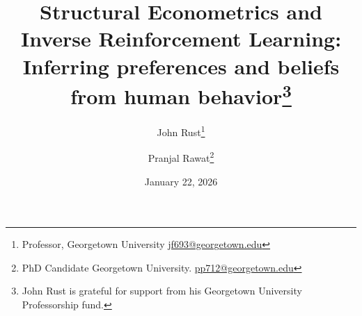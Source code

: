 \documentclass[11pt]{article}
\title{ \vspace*{1cm} \hspace*{-0.5cm}Structural Econometrics and Inverse Reinforcement Learning:\\
Inferring preferences and beliefs from human behavior\footnote{John Rust is grateful for support
from his Georgetown University Professorship fund.
}}
\author{John Rust\thanks{Professor, Georgetown University
\href{mailto:jf693@georgetown.edu}{jf693@georgetown.edu}} \and Pranjal Rawat\thanks{PhD Candidate Georgetown University.  \href{mailto:pp712@georgetown.edu}{pp712@georgetown.edu}}}
\date{ \vspace*{0.5cm} January 22, 2026 \\ \bigskip {\Large PRELIMINARY DRAFT: NOT FOR CIRCULATION} }
\begin{document}
\bgroup
\let\footnoterule\relax

\maketitle


\thispagestyle{empty}

\clearpage
\egroup
\setcounter{page}{1}















\clearpage
\begin{singlespace}
%
%


\end{singlespace}



% 
% 
\end{document}
